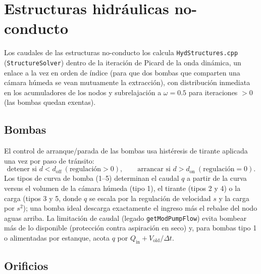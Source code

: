 \documentclass[11pt,a4paper]{article}
\begin{document}
\section{Estructuras hidráulicas no-conducto}
\label{sec:structures}

Los caudales de las estructuras no-conducto los calcula \texttt{HydStructures.cpp}
(\texttt{StructureSolver}) dentro de la iteración de Picard de la onda
dinámica, un enlace a la vez en orden de índice (para que dos bombas que
comparten una cámara húmeda se vean mutuamente la extracción), con distribución
inmediata en los acumuladores de los nodos y subrelajación a $\omega = 0.5$
para iteraciones $> 0$ (las bombas quedan exentas).

\subsection{Bombas}

El control de arranque/parada de las bombas usa histéresis de tirante aplicada
una vez por paso de tránsito:
\begin{equation}
  \text{detener si } d < d_{\mathrm{off}} \ (\text{regulación} > 0),
  \qquad
  \text{arrancar si } d > d_{\mathrm{on}} \ (\text{regulación} = 0).
\end{equation}
Los tipos de curva de bomba (1--5) determinan el caudal $q$ a partir de la curva
versus el volumen de la cámara húmeda (tipo 1), el tirante (tipos 2 y 4) o la
carga (tipos 3 y 5, donde $q$ se escala por la regulación de velocidad $s$ y la
carga por $s^2$); una bomba ideal descarga exactamente el ingreso más el rebalse
del nodo aguas arriba. La limitación de caudal (legado
\texttt{getModPumpFlow}) evita bombear más de lo disponible (protección contra
aspiración en seco) y, para bombas tipo 1 o alimentadas por estanque, acota $q$
por $Q_{\mathrm{in}} + V_{\mathrm{old}}/\Delta t$.

\subsection{Orificios}
\end{document}
